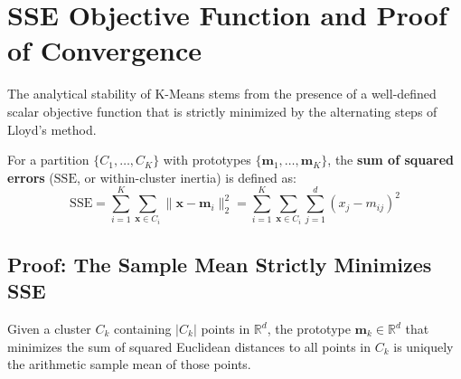 \section{SSE Objective Function and Proof of Convergence}
\label{sec:dm-kmeans-sse-convergence}

The analytical stability of K-Means stems from the presence of a well-defined scalar objective function that is strictly minimized by the alternating steps of Lloyd's method.

\begin{definition}
For a partition $\{C_1, \dots, C_K\}$ with prototypes $\{\mathbf{m}_1, \dots, \mathbf{m}_K\}$, the \textbf{sum of squared errors} ($\mathrm{SSE}$, or within-cluster inertia) is defined as:
\begin{equation}
    \mathrm{SSE} = \sum_{i=1}^K \sum_{\mathbf{x} \in C_i} \|\mathbf{x} - \mathbf{m}_i\|_2^2 = \sum_{i=1}^K \sum_{\mathbf{x} \in C_i} \sum_{j=1}^d (x_j - m_{ij})^2
    \label{eq:dm-sse-definition-en}
\end{equation}
\end{definition}

\subsection{Proof: The Sample Mean Strictly Minimizes SSE}

\begin{theorem}
Given a cluster $C_k$ containing $|C_k|$ points in $\mathbb{R}^d$, the prototype $\mathbf{m}_k \in \mathbb{R}^d$ that minimizes the sum of squared Euclidean distances to all points in $C_k$ is uniquely the arithmetic sample mean of those points.
\end{theorem}

